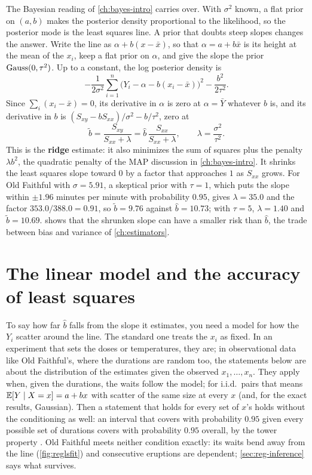 The Bayesian reading of \cref{ch:bayes-intro} carries over.
With $\sigma^2$ known, a flat prior on $(a, b)$ makes the posterior density proportional to the likelihood, so the posterior mode is the least squares line.
A prior that doubts steep slopes changes the answer.
Write the line as $\alpha + b(x - \bar{x})$, so that $\alpha = a + b\bar{x}$ is its height at the mean of the $x_i$, keep a flat prior on $\alpha$, and give the slope the prior $\text{Gauss}(0, \tau^2)$.
Up to a constant, the log posterior density is
\[
-\frac{1}{2\sigma^2}\sum_{i=1}^n \big(Y_i - \alpha - b(x_i - \bar{x})\big)^2 - \frac{b^2}{2\tau^2}.
\]
Since $\sum_i (x_i - \bar{x}) = 0$, its derivative in $\alpha$ is zero at $\alpha = \bar{Y}$ whatever $b$ is, and its derivative in $b$ is $(S_{xy} - bS_{xx})/\sigma^2 - b/\tau^2$, zero at
\[
\tilde{b} = \frac{S_{xy}}{S_{xx} + \lambda} = \hat{b}\,\frac{S_{xx}}{S_{xx} + \lambda}, \qquad \lambda = \frac{\sigma^2}{\tau^2}.
\]
This is the \textbf{ridge} estimate: it also minimizes the sum of squares plus the penalty $\lambda b^2$, the quadratic penalty of the MAP discussion in \cref{ch:bayes-intro}.
It shrinks the least squares slope toward $0$ by a factor that approaches $1$ as $S_{xx}$ grows.
For Old Faithful with $\sigma = 5.91$, a skeptical prior with $\tau = 1$, which puts the slope within $\pm 1.96$ minutes per minute with probability $0.95$, gives $\lambda = 35.0$ and the factor $353.0/388.0 = 0.91$, so $\tilde{b} = 9.76$ against $\hat{b} = 10.73$; with $\tau = 5$, $\lambda = 1.40$ and $\tilde{b} = 10.69$.
 shows that the shrunken slope can have a smaller risk than $\hat{b}$, the trade between bias and variance of \cref{ch:estimators}.

\section{The linear model and the accuracy of least squares}
\label{sec:reg-model}

To say how far $\hat{b}$ falls from the slope it estimates, you need a model for how the $Y_i$ scatter around the line.
The standard one treats the $x_i$ as fixed.
In an experiment that sets the doses or temperatures, they are; in observational data like Old Faithful's, where the durations are random too, the statements below are about the distribution of the estimates given the observed $x_1, \ldots, x_n$.
They apply when, given the durations, the waits follow the model; for i.i.d.\ pairs that means $\operatorname*{\mathbb{E}}[Y \mid X = x] = a + bx$ with scatter of the same size at every $x$ (and, for the exact results, Gaussian). Then a statement that holds for every set of $x$'s holds without the conditioning as well: an interval that covers with probability $0.95$ given every possible set of durations covers with probability $0.95$ overall, by the tower property . Old Faithful meets neither condition exactly: its waits bend away from the line (\cref{fig:reglsfit}) and consecutive eruptions are dependent; \cref{sec:reg-inference} says what survives.


